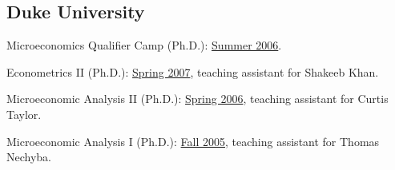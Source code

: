 \documentclass[10pt,letterpaper]{article}
\renewenvironment{itemize}{
  \begin{list}{}{
    \setlength{\leftmargin}{1.5em}
    \setlength{\itemsep}{0.25em}
    \setlength{\parskip}{0pt}
    \setlength{\parsep}{0.25em}
  }
}{
  \end{list}
}
\begin{document}
\subsection*{Duke University}

\begin{itemize}
\item Microeconomics Qualifier Camp (Ph.D.):
  \href{http://jblevins.org/courses/qualcamp06/}{Summer 2006}.
\item Econometrics II (Ph.D.):
  \href{http://jblevins.org/courses/econ342s07/}{Spring 2007}, teaching assistant for Shakeeb Khan.
\item Microeconomic Analysis II (Ph.D.):
  \href{http://jblevins.org/courses/econ302s06/}{Spring 2006}, teaching assistant for Curtis Taylor.
\item Microeconomic Analysis I (Ph.D.):
  \href{http://jblevins.org/courses/econ301f05/}{Fall 2005}, teaching assistant for Thomas Nechyba.
\end{itemize}


\end{document}

